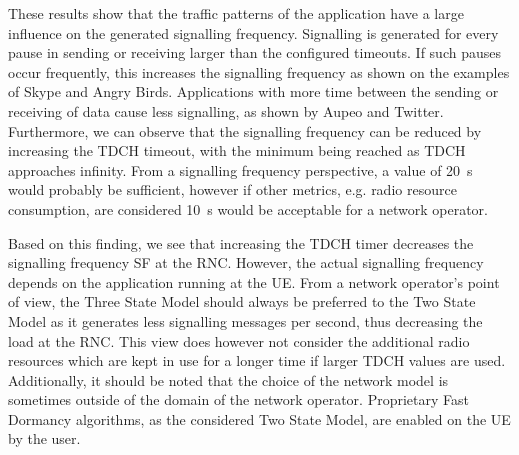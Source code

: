These results show that the traffic patterns of the application have a large influence on the generated signalling frequency.
Signalling is generated for every pause in sending or receiving larger than the configured timeouts.
If such pauses occur frequently, this increases the signalling frequency as shown on the examples of Skype and Angry Birds.
Applications with more time between the sending or receiving of data cause less signalling, as shown by Aupeo and Twitter.
Furthermore, we can observe that the signalling frequency can be reduced by increasing the \gls{TDCH} timeout, with the minimum being reached as \gls{TDCH} approaches infinity.
From a signalling frequency perspective, a value of \SI{20}{\second} would probably be sufficient, however if other metrics, e.g. radio resource consumption, are considered \SI{10}{\second} would be acceptable for a network operator.

Based on this finding, we see that increasing the \gls{TDCH} timer decreases the signalling frequency \gls{SF} at the \gls{RNC}.
However, the actual signalling frequency depends on the application running at the \gls{UE}.
From a network operator's point of view, the Three State Model should always be preferred to the Two State Model as it generates less signalling messages per second, thus decreasing the load at the \gls{RNC}.
This view does however not consider the additional radio resources which are kept in use for a longer time if larger \gls{TDCH} values are used.
Additionally, it should be noted that the choice of the network model is sometimes outside of the domain of the network operator.
Proprietary Fast Dormancy algorithms, as the considered Two State Model, are enabled on the \gls{UE} by the user.

